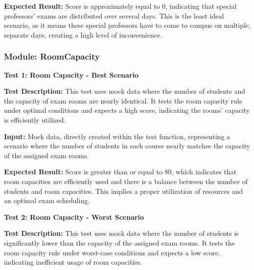  
 \textbf{Expected Result:}
Score is approximately equal to 0, indicating that special professors' exams are
distributed over several days. This is the least ideal scenario, as it means these special professors
have to come to campus on multiple, separate days, creating a high level of inconvenience.

\vspace{\baselineskip}




 \subsubsection{Module: RoomCapacity}

 
\vspace{\baselineskip}


 
 \textbf{Test 1: Room Capacity - Best Scenario}


\vspace{\baselineskip}

 
 \textbf{Test Description:}
This test uses mock data where the number of students and the capacity of
exam rooms are nearly identical. It tests the room capacity rule under optimal conditions and
expects a high score, indicating the rooms' capacity is efficiently utilized.

\vspace{\baselineskip}


 \textbf{Input:}
Mock data, directly created within the test function, representing a scenario where the
number of students in each course nearly matches the capacity of the assigned exam rooms.

\vspace{\baselineskip}

 
 \textbf{Expected Result:}
Score is greater than or equal to 80, which indicates that room capacities are
efficiently used and there is a balance between the number of students and room capacities. This
implies a proper utilization of resources and an optimal exam scheduling.

\vspace{\baselineskip}

 
 \textbf{Test 2: Room Capacity - Worst Scenario}


\vspace{\baselineskip}

 
 \textbf{Test Description:}
This test uses mock data where the number of students is significantly lower
than the capacity of the assigned exam rooms. It tests the room capacity rule under worst-case
conditions and expects a low score, indicating inefficient usage of room capacities.

